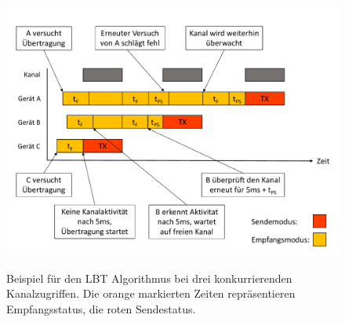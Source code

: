 \begin{figure}[bth]
        \myfloatalign
        {\includegraphics[width=1\linewidth]{gfx/LBT}} 
        \caption[Listen Before Talk]{Beispiel für den LBT Algorithmus bei drei konkurrierenden Kanalzugriffen. Die orange markierten Zeiten repräsentieren Empfangsstatus, die roten Sendestatus.}\label{fig:lbt}
\end{figure}

